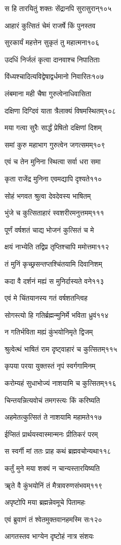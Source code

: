 स हि तारयितुं शक्तः सेंद्रानपि सुरासुरान्१०५

आहारं कुत्सितं चेमं राजर्षे किं पुनस्तव

सुरकार्यं महत्तेन सुकृतं तु महात्मना१०६

उदधिं निर्जलं कृत्वा दानवाश्च निपातिताः

विंध्यश्चादित्यविद्वेषाद्वर्धमानो निवारितः१०७

लंबमाना मही चैषा गुरुत्वेनाधिवासिता

दक्षिणा दिग्दिवं याता त्रैलाक्यं विषमस्थितम्१०८

मया गत्वा सुरैः सार्द्धं प्रेषितो दक्षिणां दिशम्

समां कुरु महाभाग गुरुत्वेन जगत्समम्१०९

एवं च तेन मुनिना स्थित्वा सर्वा धरा समा

कृता राजेंद्र मुनिना एवमद्यापि दृश्यते११०

सोहं भगवत श्रुत्वा देवदेवस्य भाषितम्

भुंजे च कुत्सिताहारं स्वशरीरमनुत्तमम्१११

पूर्णं वर्षशतं चाद्य भोजनं कुत्सितं च मे

क्षयं नाभ्येति तद्विप्र तृप्तिश्चापि ममोत्तमा११२

तं मुनिं कृच्छ्रसन्तप्तश्चिंतयामि दिवानिशम्

कदा वै दर्शनं मह्यं स मुनिर्दास्यते वने११३

एवं मे चिंतयानस्य गतं वर्षशतन्त्विह

सोगस्त्यो हि गतिर्ब्रह्मन्मुनिर्मे भविता ध्रुवं११४

न गतिर्भविता मह्यं कुंभयोनिमृते द्विजम्

श्रुत्वेत्थं भाषितं राम दृष्ट्वाहारं च कुत्सितम्११५

कृपया परया युक्तस्तं नृपं स्वर्गगामिनम्

करोम्यहं सुधाभोज्यं नाशयामि च कुत्सितम्११६

चिन्तयन्नित्यवोचं तमगस्त्यः किं करिष्यति

अहमेतत्कुत्सितं ते नाशयामि महामते११७

ईप्सितं प्रार्थयस्वास्मान्मनः प्रीतिकरं परम्

स स्वर्गी मां ततः प्राह कथं ब्रह्मवचोन्यथा११८

कर्तुं मुने मया शक्यं न चान्यस्तारयिष्यति

ॠते वै कुंभयोनिं तं मैत्रावरुणसंभवम्११९

अपृष्टोपि मया ब्रह्मन्नेवमूचे पितामहः

एवं ब्रुवाणं तं श्वेतमुक्तवानहमस्मि सः१२०

आगतस्तव भाग्येन दृष्टोहं नात्र संशयः

